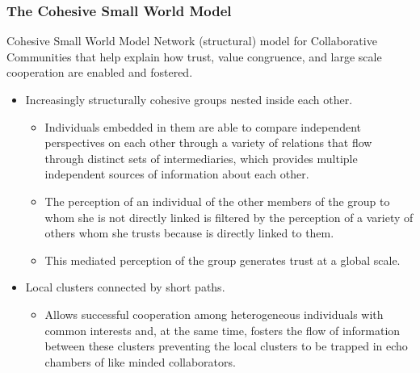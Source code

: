 \documentclass[ignorenonframetext,red,8pt,notes=hide]{beamer}
\begin{document}
\begin{frame}
\frametitle{The Cohesive Small World Model}

\begin{block}{Cohesive Small World Model}
Network (structural) model for Collaborative Communities that help explain how trust, value congruence, and large scale cooperation are enabled and fostered.

\begin{itemize}
\item Increasingly structurally cohesive groups nested inside each other.
\begin{itemize}
\item Individuals embedded in them are able to compare independent perspectives on each other through a variety of relations that flow through distinct sets of intermediaries, which provides multiple independent sources of information about each other.
\item The perception of an individual of the other members of the group to whom she is not directly linked is filtered by the perception of a variety of others whom she trusts because is directly linked to them. 
\item This mediated perception of the group generates trust at a global scale. 
\end{itemize}

\item Local clusters connected by short paths.
\begin{itemize}
\item Allows successful cooperation among heterogeneous individuals with common interests and, at the same time, fosters the flow of information between these clusters preventing the local clusters to be trapped in echo chambers of like minded collaborators.
\end{itemize}

\end{itemize}
\end{block}




\end{frame}
\end{document}
